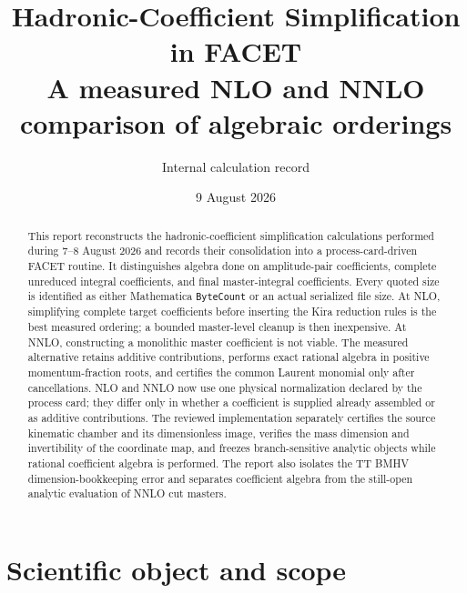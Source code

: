 \documentclass[11pt]{article}
\title{\vspace{-1.1cm}\textbf{Hadronic-Coefficient Simplification in FACET}\\[0.35em]
\large A measured NLO and NNLO comparison of algebraic orderings}
\author{Internal calculation record}
\date{9 August 2026}
\newcommand{\code}[1]{\texttt{#1}}
\begin{document}
\maketitle

\begin{abstract}
This report reconstructs the hadronic-coefficient simplification calculations
performed during 7--8 August 2026 and records their consolidation into a
process-card-driven FACET routine.  It distinguishes algebra done on
amplitude-pair coefficients, complete unreduced integral coefficients, and
final master-integral coefficients.  Every quoted size is identified as either
Mathematica \code{ByteCount} or an actual serialized file size.  At NLO,
simplifying complete target coefficients before inserting the Kira reduction
rules is the best measured ordering; a bounded master-level cleanup is then
inexpensive.  At NNLO, constructing a monolithic master coefficient is not
viable.  The measured alternative retains additive contributions, performs
exact rational algebra in positive momentum-fraction roots, and certifies the
common Laurent monomial only after cancellations.  NLO and NNLO now use one
physical normalization declared by the process card; they differ only in
whether a coefficient is supplied already assembled or as additive
contributions.  The reviewed implementation separately certifies the source
kinematic chamber and its dimensionless image, verifies the mass dimension and
invertibility of the coordinate map, and freezes branch-sensitive analytic
objects while rational coefficient algebra is performed.  The report also
isolates the TT BMHV dimension-bookkeeping
error and separates coefficient algebra from the still-open analytic
evaluation of NNLO cut masters.
\end{abstract}

\tableofcontents
\clearpage

\section{Scientific object and scope}
\end{document}
